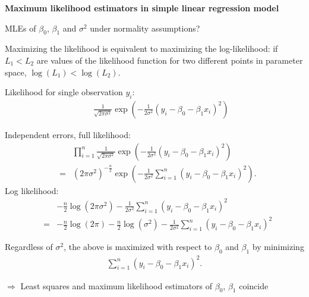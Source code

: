 \documentclass[landscape]{slides}
\newcommand{\heading}[1]{%
  \begin{center}
    \large\bf \color{red}
        #1
  \end{center}
  \vspace{1ex minus 1ex}}
\begin{document}
\begin{slide}
\heading{Maximum likelihood estimators in simple linear regression model}

MLEs of $\beta_0$, $\beta_1$ and $\sigma^2$ under
normality assumptions?

Maximizing the likelihood is equivalent to maximizing
the log-likelihood:  if $L_1<L_2$ are values
of the likelihood function for two different points
in parameter space, $\log(L_1)<\log(L_2)$.

Likelihood for single observation $y_i$:
\begin{eqnarray*}
   & &   \frac{1}{\sqrt{2\pi\sigma^2}}
       \exp\left(-\frac{1}{2\sigma^2}(y_i-\beta_0-\beta_1 x_i)^2\right)
\end{eqnarray*}

Independent errors, full likelihood:
\begin{eqnarray*}
  & & \prod_{i=1}^n
       \frac{1}{\sqrt{2\pi\sigma^2}}
       \exp\left(-\frac{1}{2\sigma^2}(y_i-\beta_0-\beta_1 x_i)^2\right) \\
        & = & (2\pi\sigma^2)^{-\frac{n}{2}}
\exp\left(-\frac{1}{2\sigma^2}\sum_{i=1}^n(y_i-\beta_0-\beta_1
x_i)^2\right).
\end{eqnarray*}
%
%
Log likelihood:
%
\begin{eqnarray*}
&  &
    -\frac{n}{2}\log(2\pi\sigma^2)-\frac{1}{2\sigma^2}\sum_{i=1}^n
     (y_i-\beta_0-\beta_1 x_i)^2  \\
   & = &
    -\frac{n}{2}\log(2\pi)-\frac{n}{2}\log(\sigma^2)  
-\frac{1}{2\sigma^2}\sum_{i=1}^n
     (y_i-\beta_0-\beta_1 x_i)^2
\end{eqnarray*}

Regardless of $\sigma^2$, the above is maximized with respect to
$\beta_0$ and $\beta_1$ by minimizing
\begin{eqnarray*}
   \sum_{i=1}^n(y_i-\beta_0-\beta_1 x_i)^2.
\end{eqnarray*}

$\Longrightarrow$ Least squares and maximum likelihood estimators of $\beta_0$,
$\beta_1$ coincide

\end{slide}
\end{document}

